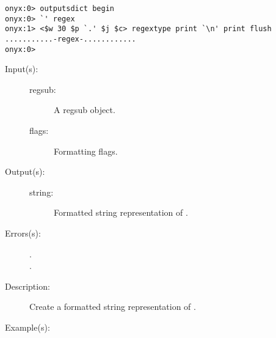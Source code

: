 \begin{description}
\begin{description}
\begin{verbatim}
onyx:0> outputsdict begin
onyx:0> `' regex
onyx:1> <$w 30 $p `.' $j $c> regextype print `\n' print flush
...........-regex-............
onyx:0>
		\end{verbatim}
	\end{description}
\label{outputsdict:regsubtype}
\item[{\onyxop{regsub flags}{regsubtype}{string}}: ]
	\begin{description}\item[]
	\item[Input(s): ]
		\begin{description}\item[]
		\item[regsub: ]
			A regsub object.
		\item[flags: ]
			Formatting flags.
		\end{description}
	\item[Output(s): ]
		\begin{description}\item[]
		\item[string: ]
			Formatted string representation of .
		\end{description}
	\item[Errors(s): ]
		\begin{description}\item[]
		\item[.]
		\item[.]
		\end{description}
	\item[Description: ]
		Create a formatted string representation of .
	\item[Example(s): ]\begin{verbatim}


\end{verbatim}
\end{description}
\end{description}
